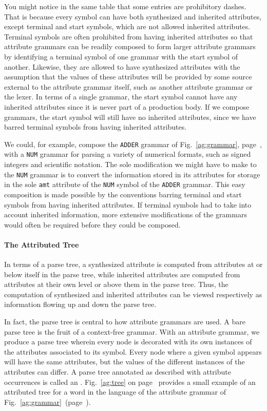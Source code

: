 You might notice in the same table that some entries are prohibitory dashes. That is because every symbol can have both synthesized and inherited attributes, except terminal and start symbols, which are not allowed inherited attributes. Terminal symbols are often prohibited from having inherited attributes so that attribute grammars can be readily composed to form larger attribute grammars by identifying a terminal symbol of one grammar with the start symbol of another. Likewise, they are allowed to have synthesized attributes with the assumption that the values of these attributes will be provided by some source external to the attribute grammar itself, such as another attribute grammar or the lexer. In terms of a single grammar, the start symbol cannot have any inherited attributes since it is never part of a production body. If we compose grammars, the start symbol will still have no inherited attributes, since we have barred terminal symbols from having inherited attributes.

We could, for example, compose the \lstinline{ADDER} grammar of Fig.~\ref{ag:grammar}, page~\pageref{ag:grammar}, with a \lstinline{NUM} grammar for parsing a variety of numerical formats, such as signed integers and scientific notation. The sole modification we might have to make to the \lstinline{NUM} grammar is to convert the information stored in its attributes for storage in the sole \lstinline{amt} attribute of the \lstinline{NUM} symbol of the \lstinline{ADDER} grammar. This easy composition is made possible by the conventions barring terminal and start symbols from having inherited attributes. If terminal symbols had to take into account inherited information, more extensive modifications of the grammars would often be required before they could be composed.

\paragraph{The Attributed Tree}
In terms of a parse tree, a synthesized attribute is computed from attributes at or below itself in the parse tree, while inherited attributes are computed from attributes at their own level or above them in the parse tree. Thus, the computation of synthesized and inherited attributes can be viewed respectively as information flowing up and down the parse tree.

In fact, the parse tree is central to how attribute grammars are used. A bare parse tree is the fruit of a context-free grammar. With an attribute grammar, we produce a parse tree wherein every node is decorated with its own instances of the attributes associated to its symbol. Every node where a given symbol appears will have the same attributes, but the values of the different instances of the attributes can differ. A parse tree annotated as described with attribute occurrences is called an . Fig.~\ref{ag:tree} on page~\pageref{ag:tree} provides a small example of an attributed tree for a word in the language of the attribute grammar of Fig.~\ref{ag:grammar}~(page~\pageref{ag:grammar}).


